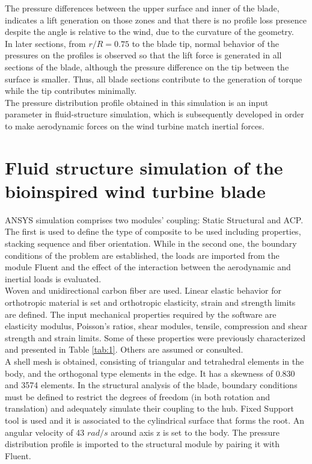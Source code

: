 The pressure differences between the upper surface and inner of the blade, indicates a lift generation on those zones and that there is no profile loss presence despite the angle is relative to the wind, due to the curvature of the geometry.\\

In later sections, from $r / R = 0.75$ to the blade tip, normal behavior of the pressures on the profiles is observed so that the lift force is generated in all sections of the blade, although the pressure difference on the tip between the surface is smaller. Thus, all blade sections contribute to the generation of torque while the tip contributes minimally.\\

The pressure distribution profile obtained in this simulation is an input parameter in fluid-structure simulation, which is subsequently developed in order to make aerodynamic forces on the wind turbine match inertial forces.

\section{Fluid structure simulation of the bioinspired wind turbine blade}
\label{sec:5}

ANSYS  simulation comprises two modules’ coupling: Static Structural and ACP. The first is used to define the type of composite to be used including properties, stacking sequence and fiber orientation. While in the second one, the boundary conditions of the problem are established, the loads are imported from the module Fluent and the effect of the interaction between the aerodynamic and inertial loads is evaluated.\\

Woven and unidirectional carbon fiber are used. Linear elastic behavior for orthotropic material is set and orthotropic elasticity, strain and strength limits are defined. The input mechanical properties required by the software are elasticity modulus, Poisson's ratios, shear modules, tensile, compression and shear strength and strain limits. Some of these properties were previously characterized and presented in Table \ref{tab:1}. Others are assumed or consulted.\\
 
A shell mesh is obtained, consisting of triangular and tetrahedral elements in the body, and the orthogonal type elements in the edge. It has a skewness of 0.830 and 3574 elements. In the structural analysis of the blade, boundary conditions must be defined to restrict the degrees of freedom (in both rotation and translation) and adequately simulate their coupling to the hub. Fixed Support tool is used and it is associated to the cylindrical surface that forms the root. An angular velocity of 43 $rad / s$ around axis z is set to the body. The pressure distribution profile is imported to the structural module by pairing it with Fluent.\\

